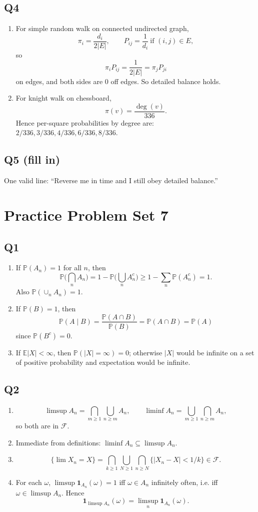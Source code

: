 \documentclass[11pt]{article}
\newcommand{\PP}{\mathbb{P}}
\newcommand{\EE}{\mathbb{E}}
\newcommand{\1}{\mathbf{1}}
\begin{document}
\subsection*{Q4}
\begin{enumerate}[label=(\alph*)]
\item For simple random walk on connected undirected graph,
\[
\pi_i=\frac{d_i}{2|E|},\qquad P_{ij}=\frac1{d_i}\ \text{if }(i,j)\in E,
\]
so
\[
\pi_iP_{ij}=\frac1{2|E|}=\pi_jP_{ji}
\]
on edges, and both sides are $0$ off edges. So detailed balance holds.
\item For knight walk on chessboard,
\[
\pi(v)=\frac{\deg(v)}{336}.
\]
Hence per-square probabilities by degree are: $2/336,3/336,4/336,6/336,8/336$.
\end{enumerate}

\subsection*{Q5 (fill in)}
One valid line: ``Reverse me in time and I still obey detailed balance.''

\section{Practice Problem Set 7}

\subsection*{Q1}
\begin{enumerate}[label=(\alph*)]
\item If $\PP(A_n)=1$ for all $n$, then
\[
\PP\Big(\bigcap_n A_n\Big)=1-\PP\Big(\bigcup_n A_n^c\Big)\ge1-\sum_n\PP(A_n^c)=1.
\]
Also $\PP(\cup_n A_n)=1$.
\item If $\PP(B)=1$, then
\[
\PP(A\mid B)=\frac{\PP(A\cap B)}{\PP(B)}=\PP(A\cap B)=\PP(A)
\]
since $\PP(B^c)=0$.
\item If $\EE|X|<\infty$, then $\PP(|X|=\infty)=0$; otherwise $|X|$ would be infinite on a set of positive probability and expectation would be infinite.
\end{enumerate}

\subsection*{Q2}
\begin{enumerate}[label=(\alph*)]
\item
\[
\limsup A_n=\bigcap_{m\ge1}\bigcup_{n\ge m}A_n,\qquad
\liminf A_n=\bigcup_{m\ge1}\bigcap_{n\ge m}A_n,
\]
so both are in $\mathcal F$.
\item Immediate from definitions: $\liminf A_n\subseteq \limsup A_n$.
\item
\[
\{\lim X_n=X\}=\bigcap_{k\ge1}\bigcup_{N\ge1}\bigcap_{n\ge N}\{|X_n-X|<1/k\}\in\mathcal F.
\]
\item For each $\omega$, $\limsup\1_{A_n}(\omega)=1$ iff $\omega\in A_n$ infinitely often, i.e. iff $\omega\in\limsup A_n$. Hence
\[
\1_{\limsup A_n}(\omega)=\limsup_n\1_{A_n}(\omega).
\]
\end{enumerate}
\end{document}
